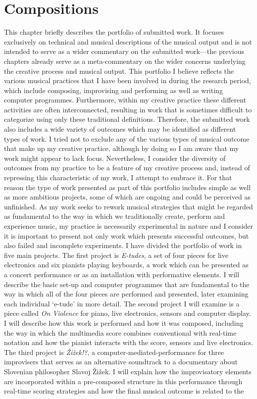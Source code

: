 \hypertarget{chapter6}{}
\chapter{Compositions}

This chapter briefly describes the portfolio of submitted work. It focuses exclusively on technical and musical descriptions of the musical output and is not intended to serve as a wider commentary on the submitted work---the previous chapters already serve as a meta-commentary on the wider concerns underlying the creative process and musical output. This portfolio I believe reflects the various musical practices that I have been involved in during the research period, which include composing, improvising and performing as well as writing computer programmes. Furthermore, within my creative practice these different activities are often interconnected, resulting in work that is sometimes difficult to categorize using only these traditional definitions. Therefore, the submitted work also includes a wide variety of outcomes which may be identified as different types of work. I tried not to exclude any of the various types of musical outcome that make up my creative practice, although by doing so I am aware that my work might appear to lack focus. Nevertheless, I consider the diversity of outcomes from my practice to be a feature of my creative process and, instead of repressing this characteristic of my work, I attempt to embrace it. For that reason the type of work presented as part of this portfolio includes simple as well as more ambitious projects, some of which are ongoing and could be perceived as unfinished. As my work seeks to rework musical strategies that might be regarded as fundamental to the way in which we traditionally create, perform and experience music, my practice is necessarily experimental in nature and I consider it is important to present not only work which presents successful outcomes, but also failed and incomplete experiments. I have divided the portfolio of work in five main projects. The first project is \emph{E-tudes}, a set of four pieces for live electronics and six pianists playing keyboards, a work which can be presented as a concert performance or as an installation with performative elements. I will describe the basic set-up and computer programmes that are fundamental to the way in which all of the four pieces are performed and presented, later examining each individual `e-tude' in more detail. The second project I will examine is a piece called \emph{On Violence} for piano, live electronics, sensors and computer display. I will describe how this work is performed and how it was composed, including the way in which the multimedia score combines conventional with real-time notation and how the pianist interacts with the score, sensors and live electronics. The third project is \emph{\v{Z}i\v{z}ek!?}, a \mbox{computer-mediated-performance} for three improvisers that serves as an alternative soundtrack to a documentary about Slovenian philosopher Slavoj \v{Z}i\v{z}ek. I will explain how the improvisatory elements are incorporated within a pre-composed structure in this performance through real-time scoring strategies and how the final musical outcome is related to the 